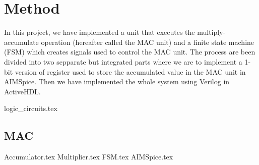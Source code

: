 \section{Method}
In this project, we have implemented a unit that executes the multiply-accumulate
operation (hereafter called the MAC unit) and a finite state machine (FSM) which creates
signals used to control the MAC unit. The process are been divided into two sepparate but integrated parts where we are to implement a 1-bit version of register used to store the accumulated value in the MAC unit in AIMSpice. Then we have implemented the whole system using Verilog in ActiveHDL.



{logic_circuits.tex}
\subsection{MAC} 
{Accumulator.tex}
{Multiplier.tex}
{FSM.tex}
{AIMSpice.tex}


